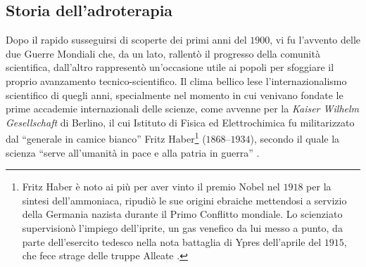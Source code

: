 \documentclass[12pt,a4paper,twoside]{report}
\begin{document}
	\subsection{Storia dell'adroterapia}\label{sec:storia_adroterapia}
	Dopo il rapido susseguirsi di scoperte dei primi anni del $1900$, vi fu l'avvento delle due Guerre Mondiali che, da un lato, rallentò il progresso della comunità scientifica, dall'altro rappresentò un'occasione utile ai popoli per sfoggiare il proprio avanzamento tecnico-scientifico. Il clima bellico lese l'internazionalismo scientifico di quegli anni, specialmente nel momento in cui venivano fondate le prime accademie internazionali delle scienze, come avvenne per la \textit{Kaiser Wilhelm Gesellschaft} di Berlino, il cui Istituto di Fisica ed Elettrochimica fu militarizzato dal ``generale in camice bianco'' Fritz Haber\footnote{Fritz Haber è noto ai più per aver vinto il premio Nobel nel $1918$ per la sintesi dell'ammoniaca, ripudiò le sue origini ebraiche mettendosi a servizio della Germania nazista durante il Primo Conflitto mondiale. Lo scienziato supervisionò l'impiego dell'iprite, un gas venefico da lui messo a punto, da parte dell'esercito tedesco nella nota battaglia di Ypres dell’aprile del $1915$, che fece strage delle truppe Alleate \cite{Smart1996-vt}.} ($1868$--$1934$), secondo il quale la scienza ``serve all’umanità in pace e alla patria in guerra'' \cite{Friedrich2017-wl,pietro_greco}.
	
\end{document}
